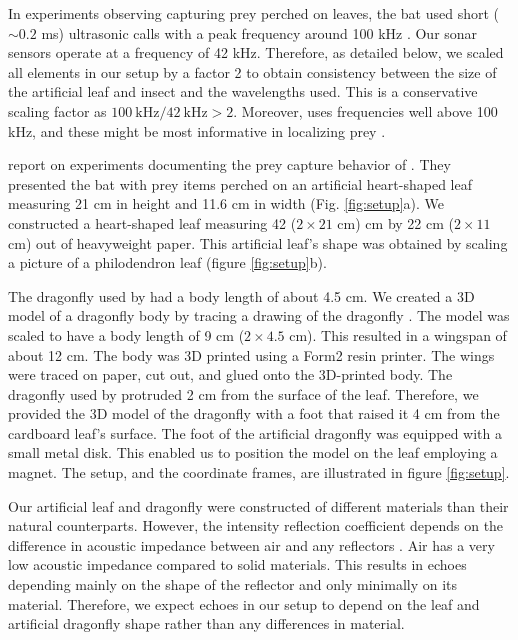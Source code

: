 \documentclass[letterpaper]{article}
\begin{document}
In experiments observing  capturing prey perched on leaves, the bat used short ($\sim 0.2$ ms) ultrasonic calls with a peak frequency around 100 kHz \citep{Geipel2013}.  Our sonar sensors operate at a frequency of 42 kHz. Therefore, as detailed below, we scaled all elements in our setup by a factor 2 to obtain consistency between the size of the artificial leaf and insect and the wavelengths used. This is a conservative scaling factor as $100\ \mbox{kHz} / 42\ \mbox{kHz} > 2$. Moreover,  uses frequencies well above 100 kHz, and these might be most informative in localizing prey \citep{Geipel2019}.

\citet{Geipel2019} report on experiments documenting the prey capture behavior of . They presented the bat with prey items perched on an artificial heart-shaped leaf measuring 21 cm in height and 11.6 cm in width (Fig. \ref{fig:setup}a). We constructed a heart-shaped leaf measuring 42 ($2 \times 21$ cm) cm by 22 cm ($2 \times 11$ cm) out of heavyweight paper. This artificial leaf's shape was obtained by scaling a picture of a philodendron leaf (figure \ref{fig:setup}b).

The dragonfly used by \citet{Geipel2019} had a body length of about 4.5 cm. We created a 3D model of a dragonfly body by tracing a drawing of the dragonfly  \citep[][plate V]{Dragonflies1890}. The model was scaled to have a body length of 9 cm ($2 \times 4.5$ cm). This resulted in a wingspan of about 12 cm. The body was 3D printed using a Form2 resin printer. The wings were traced on paper, cut out, and glued onto the 3D-printed body. The dragonfly used by \citet{Geipel2019} protruded 2 cm from the surface of the leaf. Therefore, we provided the 3D model of the dragonfly with a foot that raised it 4 cm from the cardboard leaf's surface. The foot of the artificial dragonfly was equipped with a small metal disk. This enabled us to position the model on the leaf employing a magnet. The setup, and the coordinate frames, are illustrated in figure \ref{fig:setup}.

Our artificial leaf and dragonfly were constructed of different materials than their natural counterparts. However, the intensity reflection coefficient depends on the difference in acoustic impedance between air and any reflectors \citep{Alkins2014}. Air has a very low acoustic impedance compared to solid materials. This results in echoes depending mainly on the shape of the reflector and only minimally on its material. Therefore, we expect echoes in our setup to depend on the leaf and artificial dragonfly shape rather than any differences in material.
\end{document}

